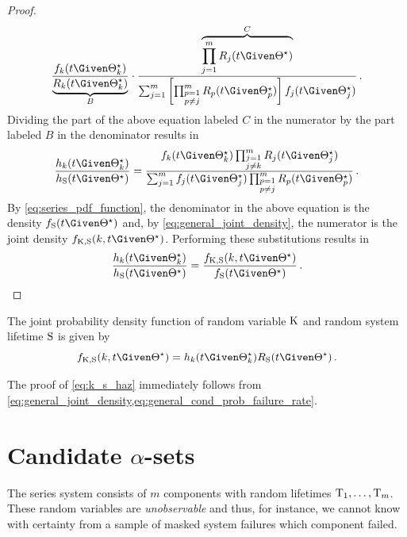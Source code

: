\documentclass[../main.tex]{subfiles}
\begin{document}
\begin{proof}
\begin{equation}
    \frac{\pdf_k(t \Given \tparam{\sysparam}_k)}{\underbrace{\srv_k(t \Given \tparam{\sysparam}_k)}_{B}} \cdot
    \frac{\overbrace{\prod_{j=1}^{m} \srv_j(t \Given \tparam{\sysparam})}^{C} }{\sum_{j=1}^{m} \left [ \prod_{\substack{p=1\\p \neq j}}^{m} \srv_p(t \Given \tparam{\sysparam}_p) \right ] \pdf_j(t \Given \tparam{\sysparam}_j)}\,.
\end{equation}
Dividing the part of the above equation labeled $C$ in the numerator by the part labeled $B$ in the denominator results in
\begin{equation}
    \frac{\haz_k(t \Given \tparam{\sysparam}_k)}{\haz_{\sv}(t \Given \tparam{\sysparam})} = \frac{\pdf_k(t \Given \tparam{\sysparam}_k) \prod_{\substack{j=1\\j \neq k}}^{m} \srv_j(t \Given \tparam{\sysparam}_j)} {\sum_{j=1}^{m} \pdf_j(t \Given \tparam{\sysparam}_j) \prod_{\substack{p=1\\p \neq j}}^{m} \srv_p(t \Given \tparam{\sysparam}_p)}\,.
\end{equation}
By \cref{eq:series_pdf_function}, the denominator in the above equation is the density $\spdf(t \Given \tparam\sysparam)$ and, by \cref{eq:general_joint_density}, the numerator is the joint density $\pdf_{\RV{K}, \sv}(k, t \Given \tparam\sysparam)$. Performing these substitutions results in
\begin{equation}
\frac{\haz_k(t \Given \tparam{\sysparam}_k)}{\haz_{\sv}(t \Given \tparam\sysparam)} = \frac{\pdf_{\RV{K}, \sv}(k, t \Given \tparam\sysparam)}{\spdf(t \Given \tparam\sysparam)}\,.
\end{equation}
\end{proof}
\begin{corollary}
The joint probability density function of random variable $\mathrm{K}$ and random system lifetime $\mathrm{S}$ is given by
\begin{equation}
\label{eq:k_s_haz}
    \pdf_{\RV{K}, \sv}(k, t\Given \tparam\sysparam) = \haz_k(t \Given \tparam{\sysparam}_k) \srv_{\sv}(t \Given \tparam\sysparam)\,.
\end{equation}
\end{corollary}
The proof of \cref{eq:k_s_haz} immediately follows from \cref{eq:general_joint_density,eq:general_cond_prob_failure_rate}.

\section{Candidate $\alpha$-sets}
\label{sec:cand_sel}
The series system consists of $m$ components with random lifetimes $\mathrm{T}_1,\ldots,\mathrm{T}_m$.
These random variables are \emph{unobservable} and thus, for instance, we cannot know with certainty from a sample of masked system failures which component failed.
\end{document}
